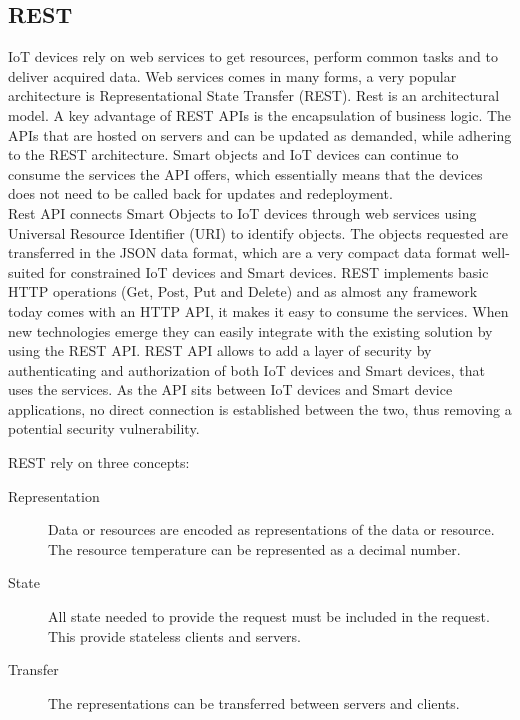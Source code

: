 \subsection{REST}
IoT devices rely on web services to get resources, perform common tasks and to deliver acquired data. Web services comes in many forms, a very popular architecture is Representational State Transfer (REST). Rest is an architectural model. A key advantage of REST APIs is the encapsulation of business logic. The APIs that are hosted on servers and can be updated as demanded, while adhering to the REST architecture. Smart objects and IoT devices can continue to consume the services the API offers, which essentially means that the devices does not need to be called back for updates and redeployment. \\

Rest API connects Smart Objects to IoT devices through web services using Universal Resource Identifier (URI) to identify objects. The objects requested are transferred in the JSON data format, which are a very compact data format well-suited for constrained IoT devices and Smart devices. REST implements basic HTTP operations (Get, Post, Put and Delete) and as almost any framework today comes with an HTTP API, it makes it easy to consume the services. When new technologies emerge they can easily integrate with the existing solution by using the REST API. REST API allows to add a layer of security by authenticating and authorization of both IoT devices and Smart devices, that uses the services. As the API sits between IoT devices and Smart device applications, no direct connection is established between the two, thus removing a potential security vulnerability. 

REST rely on three concepts: 
\begin{description}
    \item[Representation] Data or resources are encoded as representations of the data or resource. The resource temperature can be represented as a decimal number.
    \item[State] All state needed to provide the request must be included in the request. This provide stateless clients and servers. 
    \item[Transfer] The representations can be transferred between servers and clients.
    \cite{smartthings} 
\end{description} 
